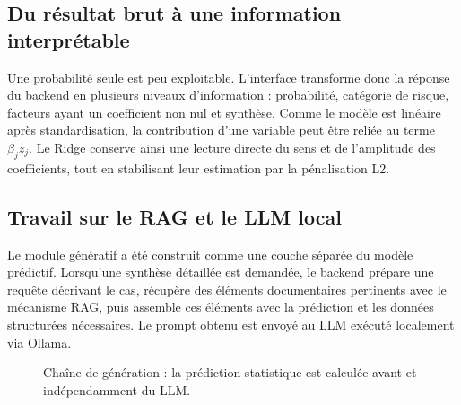 \documentclass[12pt,a4paper]{report}
\begin{document}
\subsection{Du résultat brut à une information interprétable}

Une probabilité seule est peu exploitable. L'interface transforme donc la réponse du
backend en plusieurs niveaux d'information : probabilité, catégorie de risque, facteurs
ayant un coefficient non nul et synthèse. Comme le modèle est linéaire après
standardisation, la contribution d'une variable peut être reliée au terme
$\beta_j z_j$. Le Ridge conserve ainsi une lecture directe du sens et de l'amplitude
des coefficients, tout en stabilisant leur estimation par la pénalisation L2.

\subsection{Travail sur le RAG et le LLM local}

Le module génératif a été construit comme une couche séparée du modèle prédictif. Lorsqu'une
synthèse détaillée est demandée, le backend prépare une requête décrivant le cas, récupère
des éléments documentaires pertinents avec le mécanisme RAG, puis assemble ces éléments
avec la prédiction et les données structurées nécessaires. Le prompt obtenu est envoyé au
LLM exécuté localement via Ollama.

\begin{figure}[H]
\centering
{}
\caption{Chaîne de génération : la prédiction statistique est calculée avant et indépendamment du LLM.}
\label{fig:rag-generation}
\end{figure}
\end{document}
